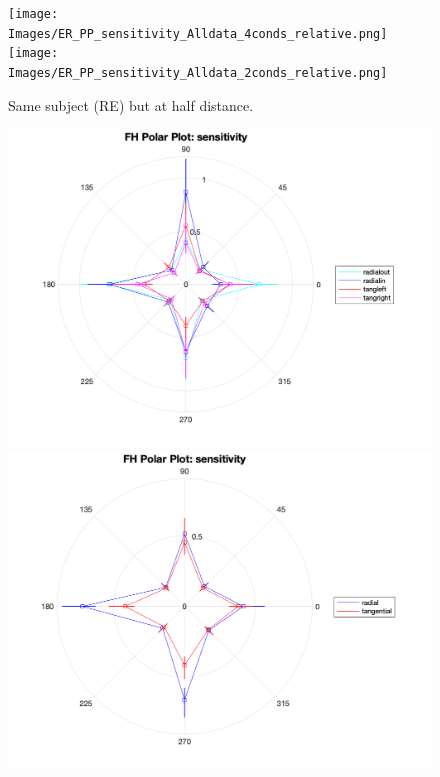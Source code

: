 \documentclass[11pt]{article} %
\begin{document}
\begin{figure}[H]
\centering %
\texttt{[image: Images/ER\_PP\_sensitivity\_Alldata\_4conds\_relative.png]}
\texttt{[image: Images/ER\_PP\_sensitivity\_Alldata\_2conds\_relative.png]}
\caption{Same subject (RE) but at half distance.}
\end{figure}
\begin{figure}[H]
\centering %
\includegraphics[scale=.3]{Images/FH_PP_sensitivity_Alldata_4conds.png}
\includegraphics[scale=.3]{Images/FH_PP_sensitivity_Alldata_2conds.png}
\end{figure}
\end{document}
